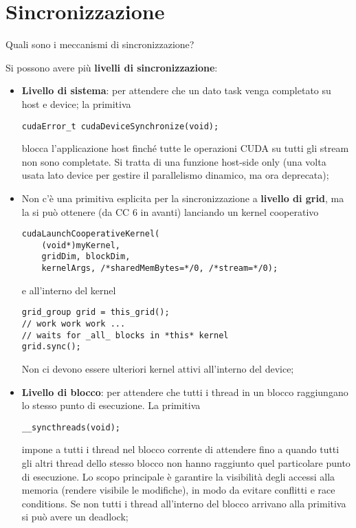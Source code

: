 \section{Sincronizzazione}

\begin{questions}
    \question Quali sono i meccanismi di sincronizzazione?
    
    \begin{solution}
        Si possono avere più \textbf{livelli di sincronizzazione}:
        \begin{itemize}
            \item \textbf{Livello di sistema}: per attendere che un dato task venga completato su host e device; la primitiva
            \begin{verbatim}
cudaError_t cudaDeviceSynchronize(void);
            \end{verbatim}
            blocca l'applicazione host finché tutte le operazioni CUDA su tutti gli stream non sono completate. Si tratta di una funzione host-side only (una volta usata lato device per gestire il parallelismo dinamico, ma ora deprecata);
            
            \item Non c'è una primitiva esplicita per la sincronizzazione a \textbf{livello di grid}, ma la si può ottenere (da CC 6 in avanti) lanciando un kernel cooperativo
            \begin{verbatim}
cudaLaunchCooperativeKernel(
    (void*)myKernel,
    gridDim, blockDim,
    kernelArgs, /*sharedMemBytes=*/0, /*stream=*/0);
            \end{verbatim}
            e all'interno del kernel
            \begin{verbatim}
grid_group grid = this_grid();
// work work work ...
// waits for _all_ blocks in *this* kernel
grid.sync();
            \end{verbatim}
            Non ci devono essere ulteriori kernel attivi all'interno del device;
            
            \item \textbf{Livello di blocco}: per attendere che tutti i thread in un blocco raggiungano lo stesso punto di esecuzione. La primitiva
            \begin{verbatim}
__syncthreads(void);
            \end{verbatim}
            impone a tutti i thread nel blocco corrente di attendere fino a quando tutti gli altri thread dello stesso blocco non hanno raggiunto quel particolare punto di esecuzione. Lo scopo principale è garantire la visibilità degli accessi alla memoria (rendere visibile le modifiche), in modo da evitare conflitti e race conditions. Se non tutti i thread all'interno del blocco arrivano alla primitiva si può avere un deadlock;
            

\end{itemize}
\end{solution}
\end{questions}
